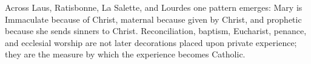 Across Laus, Ratisbonne, La Salette, and Lourdes one pattern emerges: Mary is Immaculate because of Christ, maternal because given by Christ, and prophetic because she sends sinners to Christ. Reconciliation, baptism, Eucharist, penance, and ecclesial worship are not later decorations placed upon private experience; they are the measure by which the experience becomes Catholic.
